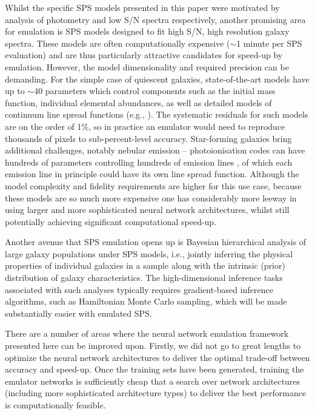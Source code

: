 \documentclass[twocolumn]{aastex62}
\begin{document}
Whilst the specific SPS models presented in this paper were motivated by analysis of photometry and low S/N spectra respectively, another promising area for emulation is SPS models designed to fit high S/N, high resolution galaxy spectra. These models are often computationally expensive ($\sim$1 minute per SPS evaluation) and are thus particularly attractive candidates for speed-up by emulation. However, the model dimensionality and required precision can be demanding. For the simple case of quiescent galaxies, state-of-the-art models have up to $\sim$40 parameters which control components such as the initial mass function, individual elemental abundances, as well as detailed models of continuum line spread functions (e.g., \citealt{conroy12,conroy18}). The systematic residuals for such models are on the order of 1\%, so in practice an emulator would need to reproduce thousands of pixels to sub-percent-level accuracy. Star-forming galaxies bring additional challenges, notably nebular emission -- photoionisation codes can have hundreds of parameters controlling hundreds of emission lines \citep{ferland17}, of which each emission line in principle could have its own line spread function. Although the model complexity and fidelity requirements are higher for this use case, because these models are so much more expensive one has considerably more leeway in using larger and more sophisticated neural network architectures, whilst still potentially achieving significant computational speed-up.

Another avenue that SPS emulation opens up is Bayesian hierarchical analysis of large galaxy populations under SPS models, i.e., jointly inferring the physical properties of individual galaxies in a sample along with the intrinsic (prior) distribution of galaxy characteristics. The high-dimensional inference tasks associated with such analyses typically requires gradient-based inference algorithms, such as Hamiltonian Monte Carlo sampling, which will be made substantially easier with emulated SPS.

There are a number of areas where the neural network emulation framework presented here can be improved upon. Firstly, we did not go to great lengths to optimize the neural network architectures to deliver the optimal trade-off between accuracy and speed-up. Once the training sets have been generated, training the emulator networks is sufficiently cheap that a search over network architectures (including more sophisticated architecture types) to deliver the best performance is computationally feasible. 
\end{document}
